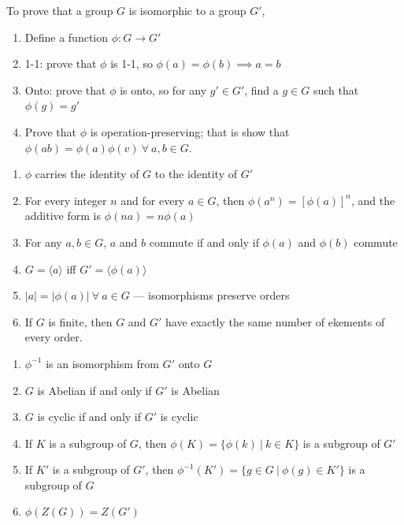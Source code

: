 \documentclass[12pt]{scrartcl}
\begin{document}
\begin{note}
  To prove that a group $G$ is isomorphic to a group $G'$, 
  \begin{enumerate}
    \item Define a function $\phi: G \to G'$
    \item 1-1: prove that $\phi$ is 1-1, so $\phi(a) = \phi(b) \implies a = b$
    \item Onto: prove that $\phi$ is onto, so for any $g' \in G'$, find a $g \in G$ such that $\phi(g) = g'$
    \item Prove that $\phi$ is operation-preserving; that is show that $\phi(ab) = \phi(a)\phi(v) \ \forall \ a, b \in G$. 
  \end{enumerate}
\end{note}

\begin{theorem}
  \hfill

  \begin{enumerate}
    \item $\phi$ carries the identity of $G$ to the identity of $G'$
    \item For every integer $n$ and for every $a \in G$, then $\phi(a^n) = [\phi(a)]^n$, and the 
    additive form is $\phi(na) = n\phi(a)$
    \item For any $a, b \in G$, $a$ and $b$ commute if and only if $\phi(a)$ and $\phi(b)$ commute 
    \item $G = \langle a \rangle$ iff $G' = \langle \phi(a) \rangle$
    \item $|a| = |\phi(a)| \ \forall \ a \in G$ --- isomorphisms preserve orders 
    \item If $G$ is finite, then $G$ and $G'$ have exactly the same number of ekements of every order.
  \end{enumerate}
\end{theorem}

\begin{theorem}
  \hfill

  \begin{enumerate}
    \item $\phi^{-1}$ is an isomorphism from $G'$ onto $G$
    \item $G$ is Abelian if and only if $G'$ is Abelian
    \item $G$ is cyclic if and only if $G'$ is cyclic 
    \item If $K$ is a subgroup of $G$, then $\phi(K) = \{\phi(k) \ | \ k \in K\}$ is a subgroup of $G'$ 
    \item If $K'$ is a subgroup of $G'$, then $\phi^{-1}(K') = \{g \in G \ | \ \phi(g) \in K'\}$ is a subgroup of $G$ 
    \item $\phi(Z(G)) = Z(G')$
  \end{enumerate}
\end{theorem}
\end{document}
